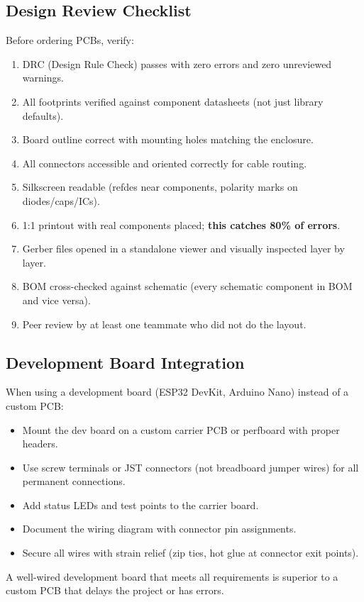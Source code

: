\documentclass[11pt,letterpaper,twoside,openany]{book}
\begin{document}
\subsection{Design Review Checklist}
Before ordering PCBs, verify:
\begin{enumerate}[nosep,leftmargin=1.5em]
\item DRC (Design Rule Check) passes with zero errors and zero unreviewed warnings.
\item All footprints verified against component datasheets (not just library defaults).
\item Board outline correct with mounting holes matching the enclosure.
\item All connectors accessible and oriented correctly for cable routing.
\item Silkscreen readable (refdes near components, polarity marks on diodes/caps/ICs).
\item 1:1 printout with real components placed; \textbf{this catches 80\% of errors}.
\item Gerber files opened in a standalone viewer and visually inspected layer by layer.
\item BOM cross-checked against schematic (every schematic component in BOM and vice versa).
\item Peer review by at least one teammate who did not do the layout.
\end{enumerate}

\subsection{Development Board Integration}
When using a development board (ESP32 DevKit, Arduino Nano) instead of a custom PCB:
\begin{itemize}[nosep,leftmargin=1.5em]
\item Mount the dev board on a custom carrier PCB or perfboard with proper headers.
\item Use screw terminals or JST connectors (not breadboard jumper wires) for all permanent connections.
\item Add status LEDs and test points to the carrier board.
\item Document the wiring diagram with connector pin assignments.
\item Secure all wires with strain relief (zip ties, hot glue at connector exit points).
\end{itemize}
A well-wired development board that meets all requirements is superior to a custom PCB that delays the project or has errors.
\end{document}
